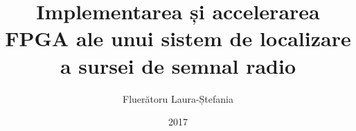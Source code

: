 \title{Implementarea și accelerarea FPGA ale unui sistem de localizare a sursei de semnal radio}
\author{Fluerătoru Laura-Ștefania}
\date{2017}


\newcommand{\project}{Implementarea și accelerarea FPGA ale unui sistem de localizare a sursei de semnal radio}

